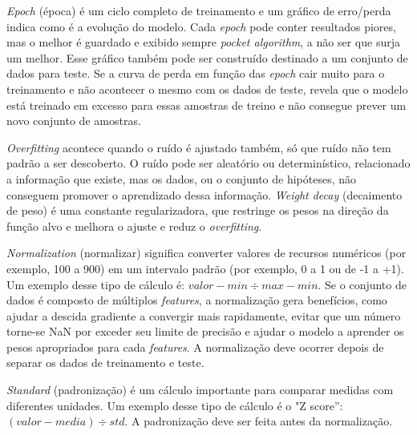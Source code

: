 \textit{Epoch} (época) é um ciclo completo de treinamento e um gráfico de erro/perda indica como é a evolução do modelo. Cada \textit{epoch} pode conter resultados piores, mas o melhor é guardado e exibido sempre \textit{pocket algorithm}, a não ser que surja um melhor. Esse gráfico também pode ser construído destinado a um conjunto de dados para teste. Se a curva de perda em função das \textit{epoch} cair muito para o treinamento e não acontecer o mesmo com os dados de teste, revela que o modelo está treinado em excesso para essas amostras de treino e não consegue prever um novo conjunto de amostras.

\textit{Overfitting} acontece quando o ruído é ajustado também, só que ruído não tem padrão a ser descoberto. O ruído pode ser aleatório ou determinístico, relacionado a informação que existe, mas os dados, ou o conjunto de hipóteses, não conseguem promover o aprendizado dessa informação. \textit{Weight decay} (decaimento de peso) é uma constante regularizadora, que restringe os pesos na direção da função alvo e melhora o ajuste e reduz o \textit{overfitting}.

\textit{Normalization} (normalizar) significa converter valores de recursos numéricos (por exemplo, 100 a 900) em um intervalo padrão (por exemplo, 0 a 1 ou de -1 a +1). Um exemplo desse tipo de cálculo é: $valor - min \div max - min$. Se o conjunto de dados é composto de múltiplos \textit{features}, a normalização gera benefícios, como ajudar a descida gradiente a convergir mais rapidamente, evitar que um número torne-se NaN por exceder seu limite de precisão e ajudar o modelo a aprender os pesos apropriados para cada \textit{features}. A normalização deve ocorrer depois de separar os dados de treinamento e teste.

\textit{Standard} (padronização) é um cálculo importante para comparar medidas com diferentes unidades. Um exemplo desse tipo de cálculo é o "Z score”: $(valor - media) \div std$. A padronização deve ser feita antes da normalização.

